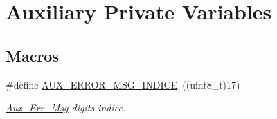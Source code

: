 \hypertarget{group___k_n_x___aux___private___variables}{}\section{Auxiliary Private Variables}
\label{group___k_n_x___aux___private___variables}
\subsection*{Macros}
\begin{DoxyCompactItemize}
\item 
\#define \hyperlink{group___k_n_x___aux___private___variables_ga18ae1c752b89b0190c4adbff64c7e36e}{A\+U\+X\+\_\+\+E\+R\+R\+O\+R\+\_\+\+M\+S\+G\+\_\+\+I\+N\+D\+I\+CE}~((uint8\+\_\+t)17)\hypertarget{group___k_n_x___aux___private___variables_ga18ae1c752b89b0190c4adbff64c7e36e}{}\label{group___k_n_x___aux___private___variables_ga18ae1c752b89b0190c4adbff64c7e36e}

\begin{DoxyCompactList}\small\item\em \hyperlink{group___k_n_x___aux___private___variables_gab56635544aea253fe5a75ded7dda1b2f}{Aux\+\_\+\+Err\+\_\+\+Msg} digits indice. \end{DoxyCompactList}\end{DoxyCompactItemize}
